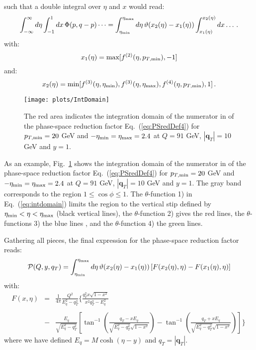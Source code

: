 \documentclass[10pt,a4paper]{article}
\begin{document}
such that a double integral over $\eta$ and $x$ would read:
\begin{equation}
\int_{-\infty}^{\infty}d\eta\int_{-1}^{1}dx\,\Phi(p,q-p)\dots =
\int_{\eta_{\rm min}}^{\eta_{\rm
    max}}d\eta\,\vartheta(x_2(\eta)-x_1(\eta))\int_{x_1(\eta)}^{x_2(\eta)}dx\dots\,.
\end{equation}
with:
\begin{equation}
x_1(\eta) = \mbox{max}[f^{(2)}(\eta,p_{T,\rm min}),-1]
\end{equation}
and:
\begin{equation}
x_2(\eta) = \mbox{min}[f^{(3)}(\eta,\eta_{\rm min}),f^{(3)}(\eta,\eta_{\rm
         max}),f^{(4)}(\eta,p_{T,\rm
         min}),1]\,.
\end{equation}

\begin{figure}[t]
  \begin{centering}
    \texttt{[image: plots/IntDomain]}
    \caption{The red area indicates the integration domain of the
      numerator in of the phase-space reduction factor
      Eq.~(\ref{eq:PSredDef4}) for $p_{T,\rm min}=20$ GeV and
      $-\eta_{\rm min}=\eta_{\rm max}=2.4$ at $Q=91$ GeV, $|\mathbf{q}_T|=10$ GeV and
      $y=1$.\label{fig:IntDomain}}
  \end{centering}
\end{figure}
As an example, Fig.~\ref{fig:IntDomain} shows the integration domain
of the numerator in of the phase-space reduction factor
Eq.~(\ref{eq:PSredDef4}) for $p_{T,\rm min}=20$ GeV and
$-\eta_{\rm min}=\eta_{\rm max}=2.4$ at $Q=91$ GeV,
$|\mathbf{q}_T|=10$ GeV and $y=1$.  The gray band corresponds to the
region $1\leq\cos\phi\leq 1$. The $\theta$-function 1) in
Eq.~(\ref{eq:intdomain}) limits the region to the vertical stip
defined by $\eta_{\rm min} < \eta < \eta_{\rm max}$ (black vertical
lines), the $\theta$-function 2) gives the red lines, the
$\theta$-functions 3) the blue lines , and the $\theta$-function 4)
the green lines.

Gathering all pieces, the final expression for the phase-space
reduction factor reads:
\begin{equation}\label{eq:finalformula}
  \mathcal{P}(Q,y,q_T)=\displaystyle \int_{\eta_{\rm
      min}}^{\eta_{\rm
      max}}d\eta\,\vartheta(x_2(\eta)-x_1(\eta))\left[F(x_2(\eta),\eta)-F(x_1(\eta) ,\eta)\right]
\end{equation}
with:
\begin{equation}\label{eq:integrandF}
\begin{array}{rcl}
\displaystyle F(x ,\eta)&=&\displaystyle \frac{1}{4\pi}\frac{Q^2}{E_q^2-q_T^2}\Bigg\{\frac{q_T^2 x\sqrt{1-x^2}}{x^2 q_T^2-
  E_q^2}\\
\\
&-&\displaystyle \frac{E_q}{\sqrt{E_q^2-q_T^2}}\left[\tan^{-1}\left(\frac{q_T-
    xE_q}{\sqrt{E_q^2-q_T^2}\sqrt{1-x^2}}\right)-\displaystyle\tan^{-1}\left(\frac{q_T+
    xE_q}{\sqrt{E_q^2-q_T^2}\sqrt{1-x^2}}\right)\right]\Bigg\}\
\end{array}
\end{equation}
where we have defined $E_q = M\cosh(\eta-y)$ and
$q_T=|\mathbf{q}_T|$.
\end{document}
